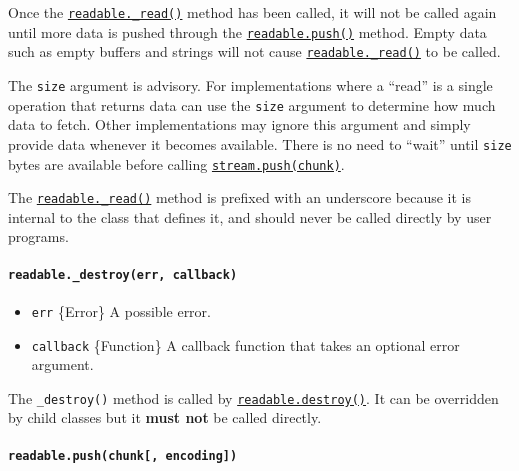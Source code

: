 Once the \hyperref[readable_readsize]{\texttt{readable.\_read()}} method
has been called, it will not be called again until more data is pushed
through the
\hyperref[readablepushchunk-encoding]{\texttt{readable.push()}} method.
Empty data such as empty buffers and strings will not cause
\hyperref[readable_readsize]{\texttt{readable.\_read()}} to be called.

The \texttt{size} argument is advisory. For implementations where a
``read'' is a single operation that returns data can use the
\texttt{size} argument to determine how much data to fetch. Other
implementations may ignore this argument and simply provide data
whenever it becomes available. There is no need to ``wait'' until
\texttt{size} bytes are available before calling
\hyperref[readablepushchunk-encoding]{\texttt{stream.push(chunk)}}.

The \hyperref[readable_readsize]{\texttt{readable.\_read()}} method is
prefixed with an underscore because it is internal to the class that
defines it, and should never be called directly by user programs.

\paragraph{\texorpdfstring{\texttt{readable.\_destroy(err,\ callback)}}{readable.\_destroy(err, callback)}}\label{readable._destroyerr-callback}

\begin{itemize}
\tightlist
\item
  \texttt{err} \{Error\} A possible error.
\item
  \texttt{callback} \{Function\} A callback function that takes an
  optional error argument.
\end{itemize}

The \texttt{\_destroy()} method is called by
\hyperref[readabledestroyerror]{\texttt{readable.destroy()}}. It can be
overridden by child classes but it \textbf{must not} be called directly.

\paragraph{\texorpdfstring{\texttt{readable.push(chunk{[},\ encoding{]})}}{readable.push(chunk{[}, encoding{]})}}\label{readable.pushchunk-encoding}

